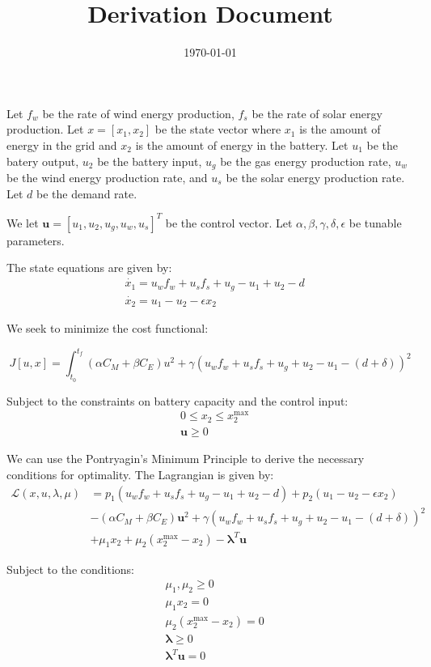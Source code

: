 \documentclass[12pt]{article}
\title{Derivation Document}
\author{}
\date{\today}
\begin{document}
\maketitle

Let $f_w$ be the rate of wind energy production, $f_s$ be the rate of solar energy production.
Let $x = [x_1, x_2]$ be the state vector where $x_1$ is the amount of energy in the grid and
 $x_2$ is the amount of energy in the battery.
Let $u_1$ be the batery output, $u_2$ be the battery input, 
$u_g$ be the gas energy production rate, $u_w$ be the wind energy production rate, and 
$u_s$ be the solar energy production rate.
Let $d$ be the demand rate.

We let $\mathbf{u} = [u_1, u_2, u_g, u_w, u_s]^T$ be the control vector.
Let $\alpha, \beta, \gamma, \delta, \epsilon$ be tunable parameters.

The state equations are given by:
\begin{align*}
    &\dot{x_1} = u_w f_w + u_s f_s + u_g - u_1 + u_2 - d \\
    &\dot{x_2} = u_1 - u_2 - \epsilon x_2
\end{align*}

We seek to minimize the cost functional:

\begin{equation*}
    J[u, x] = \int_{t_0}^{t_f} (\alpha C_M + \beta C_E)u^2 + \gamma (u_w f_w + u_s f_s + u_g + u_2 - u_1 - (d + \delta))^2 
\end{equation*}

Subject to the constraints on battery capacity and the control input:
\begin{align*}
    &0 \leq x_2 \leq x_2^{\max} \\
    &\mathbf{u} \ge 0
\end{align*}

We can use the Pontryagin's Minimum Principle to derive the necessary conditions for optimality.
The Lagrangian is given by:
\begin{align*}
    \mathcal{L}(x, u, \lambda, \mu) &= p_1 (u_w f_w + u_s f_s + u_g - u_1 + u_2 - d) + p_2 (u_1 - u_2 - \epsilon x_2) \\
    & - (\alpha C_M + \beta C_E)\mathbf{u}^2 + \gamma (u_w f_w + u_s f_s + u_g + u_2 - u_1 - (d + \delta))^2 \\
    & + \mu_1 x_2 + \mu_2 (x_2^{\max} - x_2) - \mathbf{\lambda}^T \mathbf{u}
\end{align*}

Subject to the conditions:
\begin{align*}
    &\mu_1, \mu_2 \geq 0 \\
    &\mu_1 x_2 = 0 \\
    &\mu_2 (x_2^{\max} - x_2) = 0 \\
    &\mathbf{\lambda} \geq 0 \\
    &\mathbf{\lambda}^T \mathbf{u} = 0 \\
\end{align*}
\end{document}
